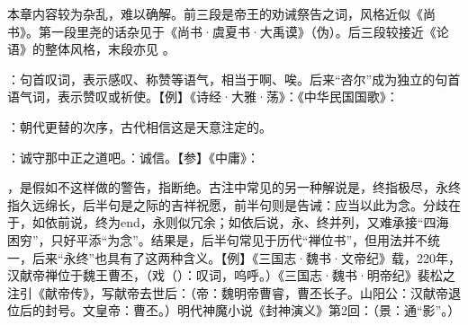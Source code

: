 {
本章内容较为杂乱，难以确解。前三段是帝王的劝诫祭告之词，风格近似《尚书》。第一段里尧的话杂见于《尚书·虞夏书·大禹谟》（伪）。后三段较接近《论语》的整体风格，末段亦见 。 %
\begin{lyitemize}
\item {}：句首叹词，表示感叹、称赞等语气，相当于啊、唉。后来“咨尔”成为独立的句首语气词，表示赞叹或祈使。【例】《诗经·大雅·荡》：《中华民国国歌》：
\item {}：朝代更替的次序，古代相信这是天意注定的。%
\item {}：诚守那中正之道吧。：诚信。【参】《中庸》：

，是假如不这样做的警告，指断绝。古注中常见的另一种解说是，终指极尽，永终指久远绵长，后半句是之际的吉祥祝愿，前半句则是告诫：应当以此为念。分歧在于，如依前说，终为end，永则似冗余；如依后说，永、终并列，又难承接“四海困穷”，只好平添“为念”。结果是，后半句常见于历代“禅位书”，但用法并不统一，后来“永终”也具有了这两种含义。【例】《三国志·魏书·文帝纪》载，220年，汉献帝禅位于魏王曹丕，（戏（）：叹词，呜呼。）《三国志·魏书·明帝纪》裴松之注引《献帝传》，写献帝去世后：（帝：魏明帝曹睿，曹丕长子。山阳公：汉献帝退位后的封号。文皇帝：曹丕。）明代神魔小说《封神演义》第2回：（景：通“影”。）


\end{lyitemize}}
